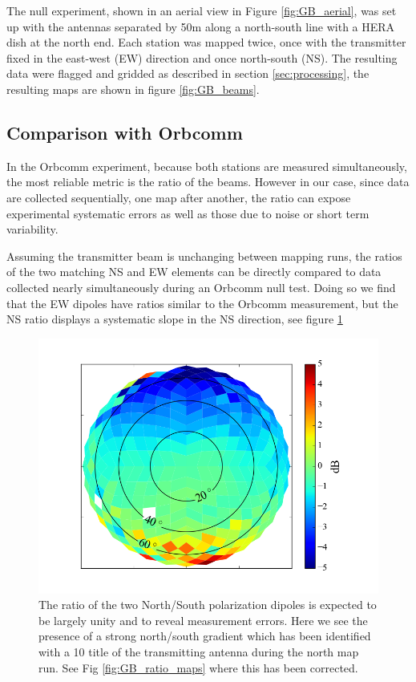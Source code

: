 \documentclass[preprint2,numberedappendix,tighten,twocolappendix]{aastex6}
\begin{document}
The null experiment, shown in an aerial view in Figure \ref{fig:GB_aerial}, was set up with the antennas separated by 50m along a north-south line with a HERA dish at the north end.  Each station was mapped twice, once with the transmitter fixed in the east-west (EW) direction and once north-south (NS).  The resulting data were flagged and gridded as described in section \ref{sec:processing}, the resulting maps are shown in figure \ref{fig:GB_beams}. 




\subsection{Comparison with Orbcomm}

In the Orbcomm experiment, because both stations are measured simultaneously,  the most reliable metric is the ratio of the beams. However in our case, since data are collected sequentially, one map after another, the ratio can expose experimental systematic errors as well as those due to noise or short term variability.

Assuming the transmitter beam is unchanging between mapping runs, the ratios of the two matching NS and EW elements can be directly compared to data collected nearly simultaneously during an Orbcomm null test.   Doing so we find that the EW dipoles have ratios similar to the Orbcomm measurement, but the NS ratio displays a systematic slope in the NS direction, see figure \ref{fig:GB_NS_ratio_uncalibrated}
\begin{figure}
\includegraphics[width=\columnwidth]{figures/GB_NS_ratio_uncalibrated.png}
\caption{The ratio of the two North/South polarization dipoles is expected to be largely unity and to reveal measurement errors. Here we see the presence of a strong north/south gradient which has been identified with a 10\arcdeg{} title of the transmitting antenna during the north map run. See Fig \ref{fig:GB_ratio_maps} where this has been corrected. }\label{fig:GB_NS_ratio_uncalibrated}
\end{figure}
\end{document}
